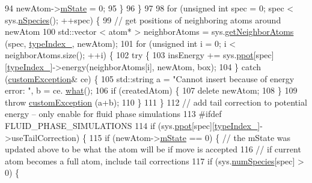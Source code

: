 \begin{DoxyCode}
94                 newAtom->\hyperlink{classatom_a3cb00c0c5b7533657e05af6ff4a42740}{mState} = 0;
95             \}
96         \}
97 
98         \textcolor{keywordflow}{for} (\textcolor{keywordtype}{unsigned} \textcolor{keywordtype}{int} spec = 0; spec < sys.\hyperlink{classsim_system_ab5e2e9b6204de15520302fe1d51688dd}{nSpecies}(); ++spec) \{
99             \textcolor{comment}{// get positions of neighboring atoms around newAtom}
100             std::vector < atom* > neighborAtoms = sys.\hyperlink{classsim_system_a9b3aeefa22c3b50b5913df6eea753bc6}{getNeighborAtoms} (spec, 
      \hyperlink{classmc_move_acb731965547b0326ef318ec96da8b46a}{typeIndex\_}, newAtom);
101             \textcolor{keywordflow}{for} (\textcolor{keywordtype}{unsigned} \textcolor{keywordtype}{int} i = 0; i < neighborAtoms.size(); ++i) \{
102             \textcolor{keywordflow}{try} \{
103                 insEnergy += sys.\hyperlink{classsim_system_ad2e290b5963f132e6a3a56cee35c8e9f}{ppot}[spec][\hyperlink{classmc_move_acb731965547b0326ef318ec96da8b46a}{typeIndex\_}]->energy(neighborAtoms[i], newAtom, 
      box);
104             \} \textcolor{keywordflow}{catch} (\hyperlink{classcustom_exception}{customException}& ce) \{
105                 std::string a = \textcolor{stringliteral}{"Cannot insert because of energy error: "}, b = ce.
      \hyperlink{classcustom_exception_aeb6ab5848b038adfc68fde86a512f691}{what}();
106                 \textcolor{keywordflow}{if} (createdAtom) \{
107                     \textcolor{keyword}{delete} newAtom;
108                 \}
109                 \textcolor{keywordflow}{throw} \hyperlink{classcustom_exception}{customException} (a+b);
110             \}
111             \}
112             \textcolor{comment}{// add tail correction to potential energy -- only enable for fluid phase simulations}
113 \textcolor{preprocessor}{#ifdef FLUID\_PHASE\_SIMULATIONS}
114 \textcolor{preprocessor}{}            \textcolor{keywordflow}{if} (sys.\hyperlink{classsim_system_ad2e290b5963f132e6a3a56cee35c8e9f}{ppot}[spec][\hyperlink{classmc_move_acb731965547b0326ef318ec96da8b46a}{typeIndex\_}]->useTailCorrection) \{
115                 \textcolor{keywordflow}{if} (newAtom->\hyperlink{classatom_a3cb00c0c5b7533657e05af6ff4a42740}{mState} == 0) \{ \textcolor{comment}{// the mState was updated above to be what the atom will
       be if move is accepted}
116                     \textcolor{comment}{// if current atom becomes a full atom, include tail corrections}
117                         \textcolor{keywordflow}{if} (sys.\hyperlink{classsim_system_a9eea865e6dc1cff377b1e79c4d9c23f0}{numSpecies}[spec] > 0) \{

\end{DoxyCode}
